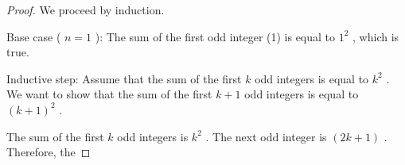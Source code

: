 \documentclass{article}
\begin{document}
\begin{proof}
We proceed by induction.

Base case ( $n = 1$ ): The sum of the first odd integer (1) is equal to  $1^2$ , which is true.

Inductive step: Assume that the sum of the first  $k$  odd integers is equal to  $k^2$ . We want to show that the sum of the first  $k+1$  odd integers is equal to  $(k+1)^2$ .

The sum of the first  $k$  odd integers is  $k^2$ . The next odd integer is  $(2k+1)$ . Therefore, the


\end{proof}


\printbibliography
\end{document}
